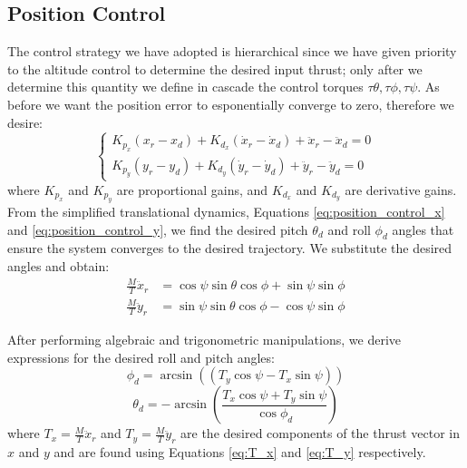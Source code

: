 \subsection{Position Control}
The control strategy we have adopted is hierarchical since we have given priority to the 
altitude control to determine the desired input thrust; only after we determine this quantity
we define in cascade the control torques $\tau\theta, \tau\phi, \tau\psi$.
As before we want the position error to esponentially converge to zero,
therefore we desire:
\begin{equation}
    \begin{cases}
        K_{p_x} ( x_r - x_d )  + K_{d_x} (\dot{x}_r -\dot{x}_d) + \ddot{x}_r -\ddot{x}_d  = 0 \\[6pt]
        K_{p_y} (y_r - y_d )  + K_{d_y} ( \dot{y}_r - \dot{y}_d) +  \ddot{y}_r - \ddot{y}_d = 0
    \end{cases}
\end{equation}
where $K_{p_x}$ and $K_{p_y}$ are proportional gains, and $K_{d_x}$ and $K_{d_y}$ are derivative gains.
\noindent \\
From the simplified translational dynamics, Equations \ref{eq:position_control_x}
and \ref{eq:position_control_y}, we find the desired pitch \( \theta_d \) 
and roll \( \phi_d \) angles that ensure the system converges to the desired trajectory.
We substitute the desired angles and obtain:
\begin{subequations}
    \begin{align}
    \frac{M}{T} \ddot{x}_r &= \cos\psi \sin\theta \cos\phi + \sin\psi \sin\phi \label{eq:T_x} \\[6pt]
    \frac{M}{T} \ddot{y}_r &= \sin\psi \sin\theta \cos\phi - \cos\psi \sin\phi \label{eq:T_y}
    \end{align}
\end{subequations}

\noindent
After performing algebraic and trigonometric manipulations, we derive expressions for the desired roll and pitch angles:
\begin{equation}
    \phi_d =  \arcsin\left(  (T_y \cos\psi - T_x \sin\psi) \right)
\end{equation}
\begin{equation}
    \theta_d = - \arcsin\left(\frac{T_x \cos\psi + T_y \sin\psi}{ \cos\phi_d } \right)
\end{equation}
where $T_x = \frac{M}{T} \ddot{x}_r$ and $T_y = \frac{M}{T} \ddot{y}_r$ are the
desired components of the thrust vector in $x$ and $y$ and are found
using Equations \ref{eq:T_x} and \ref{eq:T_y} respectively.

